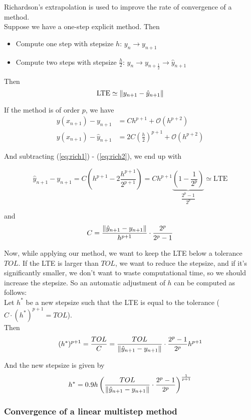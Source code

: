 Richardson's extrapolation is used to improve the rate of convergence of a method.\\

Suppose we have a one-step explicit method. Then
\begin{itemize}
    \item Compute one step with stepsize $h$: $y_n \to y_{n+1}$
    \item Compute two steps with stepsize $\frac{h}{2}$: $y_n \to y_{n+\frac{1}{2}} \to \hat{y}_{n+1}$
\end{itemize}

Then  $$\text{LTE} \simeq \left\lVert y_{n+1} - \hat{y}_{n+1}\right\rVert$$

If the method is of order $p$, we have
\begin{align}
    y(x_{n+1}) - y_{n+1} &= Ch^{p+1} + \mathcal{O}(h^{p+2})\label{eq:rich1}\\
    y(x_{n+1}) - \hat{y}_{n+1} &= 2C\left(\frac{h}{2}\right)^{p+1} + \mathcal{O}(h^{p+2}) \label{eq:rich2}
\end{align}
      
And subtracting (\ref*{eq:rich1}) - (\ref*{eq:rich2}), we end up with

$$\hat{y}_{n+1} - y_{n+1} = C\left(h^{p+1}-2\frac{h^{p+1}}{2^{p+1}}\right) = Ch^{p+1}\underbrace{\left(1-\frac{1}{2^p}\right)}_{\dfrac{2^p-1}{2^p}} \simeq \text{LTE}$$

and $$C = \frac{\left\lVert\hat{y}_{n+1}-y_{n+1}\right\rVert}{h^{p+1}}\cdot\frac{2^p}{2^p-1}$$

Now, while applying our method, we want to keep the LTE below a tolerance $TOL$. If the LTE is larger than $TOL$, we want to reduce the stepsize, and if it's significantly smaller, we don't want to waste computational time, so we should increase the stepsize. So an automatic adjustment of $h$ can be computed as follows: \\

Let $h^*$ be a new stepsize such that the LTE is equal to the tolerance ($C\cdot(h^*)^{p+1} = TOL$).\\

Then $$(h^*)^{p+1} = \frac{TOL}{C} = \frac{TOL}{\left\lVert\hat{y}_{n+1} - y_{n+1}\right\rVert}\cdot\frac{2^p-1}{2^p}h^{p+1}$$

And the new stepsize is given by $$h^* = 0.9h\left(\frac{TOL}{\left\lVert\hat{y}_{n+1} - y_{n+1}\right\rVert}\cdot\frac{2^p-1}{2^p}\right)^{\frac{1}{p+1}}$$

\newpage
\subsubsection{Convergence of a linear multistep method}

